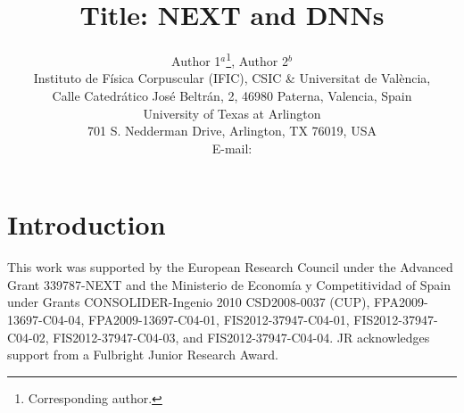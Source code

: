 \documentclass{JINST}
\title{Title: NEXT and DNNs}
\author{Author 1$^a$\thanks{Corresponding author.},
Author 2$^b$\\
\llap{$^a$}Instituto de F\'isica Corpuscular (IFIC), CSIC \& Universitat de Val\`encia,\\ 
Calle Catedr\'atico Jos\'e Beltr\'an, 2, 46980 Paterna, Valencia, Spain\\
\llap{$^b$}University of Texas at Arlington\\
 701 S. Nedderman Drive, Arlington, TX 76019, USA\\
E-mail: \email{correspodingauthor@ific.uv.es}}
\begin{document}
\section{Introduction}\label{sec:intro}



\acknowledgments

This work was supported by the European Research Council under the Advanced Grant 339787-NEXT and the Ministerio de Econom\'{i}a y Competitividad of Spain under Grants CONSOLIDER-Ingenio 2010 CSD2008-0037 (CUP), FPA2009-13697-C04-04, FPA2009-13697-C04-01, FIS2012-37947-C04-01, FIS2012-37947-C04-02, FIS2012-37947-C04-03, and FIS2012-37947-C04-04.  JR acknowledges support from a Fulbright Junior Research Award.


\end{document}
